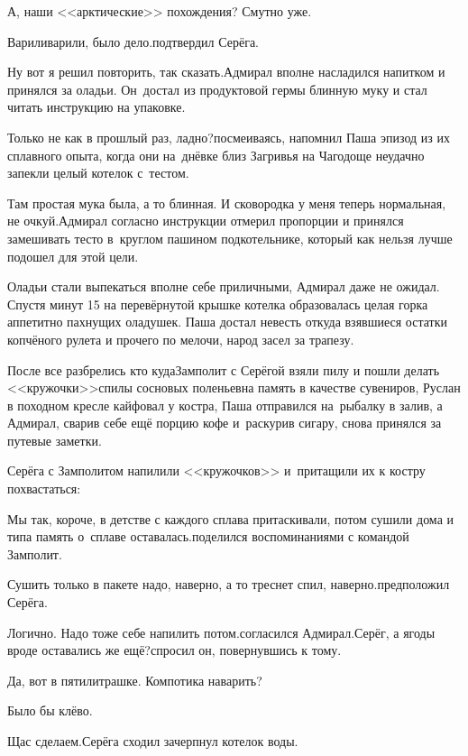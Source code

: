 \diagdash А, наши <<арктические>> похождения? Смутно уже.

\diagdash Варили\sdash варили, было дело.\mdash подтвердил Серёга.

\diagdash Ну вот я решил повторить, так сказать.\mdash Адмирал вполне насладился напитком и принялся за оладьи. Он~достал из продуктовой гермы блинную муку и стал читать инструкцию на упаковке.

\diagdash Только не как в прошлый раз, ладно?\mdash посмеиваясь, напомнил Паша эпизод из их сплавного опыта, когда они на~днёвке близ Загривья на Чагодоще неудачно запекли целый котелок с~тестом.

\diagdash Там простая мука была, а то блинная. И сковородка у меня теперь нормальная, не очкуй.\mdash Адмирал согласно инструкции отмерил пропорции и принялся замешивать тесто в~круглом пашином подкотельнике, который как нельзя лучше подошел для этой цели.

Оладьи стали выпекаться вполне себе приличными, Адмирал даже не ожидал. Спустя минут 15 на перевёрнутой крышке котелка образовалась целая горка аппетитно пахнущих оладушек. Паша достал невесть откуда взявшиеся остатки копчёного рулета и прочего по мелочи, народ засел за трапезу.

После все разбрелись кто куда\mdash Замполит с Серёгой взяли пилу и пошли делать <<кружочки>>\mdash спилы сосновых поленьев\mdash на память в качестве сувениров, Руслан в походном кресле кайфовал у костра, Паша отправился на~рыбалку в залив, а Адмирал, сварив себе ещё порцию кофе и~раскурив сигару, снова принялся за путевые заметки.

Серёга с Замполитом напилили <<кружочков>> и~притащили их к костру похвастаться:

\diagdash Мы так, короче, в детстве с каждого сплава притаскивали, потом сушили дома и типа память о~сплаве оставалась.\mdash поделился воспоминаниями с командой Замполит.

\diagdash Сушить только в пакете надо, наверно, а то треснет спил, наверно.\mdash предположил Серёга.

\diagdash Логично. Надо тоже себе напилить потом.\mdash согласился Адмирал.\mdash Серёг, а ягоды вроде оставались же ещё?\mdash спросил он, повернувшись к тому.

\diagdash Да, вот в пятилитрашке. Компотика наварить?

\diagdash Было бы клёво.

\diagdash Щас сделаем.\mdash Серёга сходил зачерпнул котелок воды.

